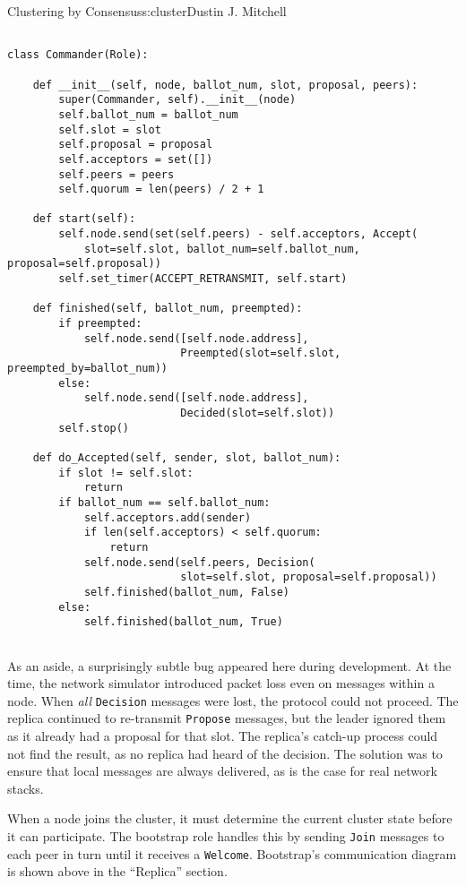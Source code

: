 \begin{aosachapter}{Clustering by Consensus}{s:cluster}{Dustin J. Mitchell}
\begin{verbatim}

class Commander(Role):

    def __init__(self, node, ballot_num, slot, proposal, peers):
        super(Commander, self).__init__(node)
        self.ballot_num = ballot_num
        self.slot = slot
        self.proposal = proposal
        self.acceptors = set([])
        self.peers = peers
        self.quorum = len(peers) / 2 + 1

    def start(self):
        self.node.send(set(self.peers) - self.acceptors, Accept(
            slot=self.slot, ballot_num=self.ballot_num, proposal=self.proposal))
        self.set_timer(ACCEPT_RETRANSMIT, self.start)

    def finished(self, ballot_num, preempted):
        if preempted:
            self.node.send([self.node.address], 
                           Preempted(slot=self.slot, preempted_by=ballot_num))
        else:
            self.node.send([self.node.address], 
                           Decided(slot=self.slot))
        self.stop()

    def do_Accepted(self, sender, slot, ballot_num):
        if slot != self.slot:
            return
        if ballot_num == self.ballot_num:
            self.acceptors.add(sender)
            if len(self.acceptors) < self.quorum:
                return
            self.node.send(self.peers, Decision(
                           slot=self.slot, proposal=self.proposal))
            self.finished(ballot_num, False)
        else:
            self.finished(ballot_num, True)
    
\end{verbatim}

As an aside, a surprisingly subtle bug appeared here during development.
At the time, the network simulator introduced packet loss even on
messages within a node. When \emph{all} \texttt{Decision} messages were
lost, the protocol could not proceed. The replica continued to
re-transmit \texttt{Propose} messages, but the leader ignored them as it
already had a proposal for that slot. The replica's catch-up process
could not find the result, as no replica had heard of the decision. The
solution was to ensure that local messages are always delivered, as is
the case for real network stacks.

\label{bootstrap}

When a node joins the cluster, it must determine the current cluster
state before it can participate. The bootstrap role handles this by
sending \texttt{Join} messages to each peer in turn until it receives a
\texttt{Welcome}. Bootstrap's communication diagram is shown above in
the ``Replica'' section.


\end{aosachapter}
